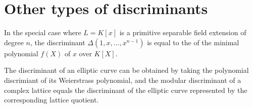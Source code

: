 \documentclass[12pt]{article}
\begin{document}
\section{Other types of discriminants}

In the special case where $L = K[x]$ is a primitive separable field extension of degree $n$, the discriminant $\Delta(1,x,\ldots,x^{n-1})$ is equal to the  of the minimal polynomial $f(X)$ of $x$ over $K[X]$.

The discriminant of an elliptic curve can be obtained by taking the polynomial discrimiant of its Weierstrass polynomial, and the modular discriminant of a complex lattice equals the discriminant of the elliptic curve represented by the corresponding lattice quotient.
\end{document}
